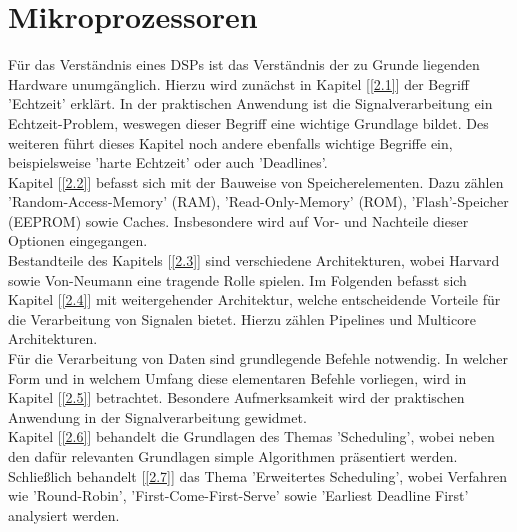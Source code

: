 \section{Mikroprozessoren}\label{2}

Für das Verständnis eines DSPs ist das Verständnis der zu Grunde liegenden Hardware unumgänglich. Hierzu wird zunächst in Kapitel [\ref{2.1}] der Begriff 'Echtzeit' erklärt. In der praktischen Anwendung ist die Signalverarbeitung ein Echtzeit-Problem, weswegen dieser Begriff eine wichtige Grundlage bildet. Des weiteren führt dieses Kapitel noch andere ebenfalls wichtige Begriffe ein, beispielsweise 'harte Echtzeit' oder auch 'Deadlines'.\\
Kapitel [\ref{2.2}] befasst sich mit der Bauweise von Speicherelementen. Dazu zählen 'Random-Access-Memory' (RAM), 'Read-Only-Memory' (ROM), 'Flash'-Speicher (EEPROM) sowie Caches. Insbesondere wird auf Vor- und Nachteile dieser Optionen eingegangen.\\
Bestandteile des Kapitels [\ref{2.3}] sind verschiedene Architekturen, wobei Harvard sowie Von-Neumann eine tragende Rolle spielen.
Im Folgenden befasst sich Kapitel [\ref{2.4}] mit weitergehender Architektur, welche entscheidende Vorteile für die Verarbeitung von Signalen bietet. Hierzu zählen Pipelines und Multicore Architekturen.\\
Für die Verarbeitung von Daten sind grundlegende Befehle notwendig. In welcher Form und in welchem Umfang diese elementaren Befehle vorliegen, wird in Kapitel [\ref{2.5}] betrachtet. Besondere Aufmerksamkeit wird der praktischen Anwendung in der Signalverarbeitung gewidmet.\\
Kapitel [\ref{2.6}] behandelt die Grundlagen des Themas 'Scheduling', wobei neben den dafür relevanten Grundlagen simple Algorithmen präsentiert werden.
Schließlich behandelt [\ref{2.7}] das Thema 'Erweitertes Scheduling', wobei Verfahren wie 'Round-Robin', 'First-Come-First-Serve' sowie 'Earliest Deadline First' analysiert werden.\\

\newpage

